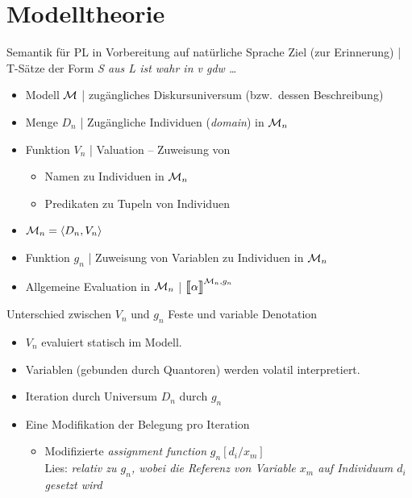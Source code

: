 \section{Modelltheorie}

\begin{frame}
  {Semantik für PL in Vorbereitung auf natürliche Sprache}
  \onslide<+->
  \onslide<+->
  Ziel (zur Erinnerung) | T-Sätze der Form \textit{S aus L ist wahr in v gdw \ldots}\\
  \Halbzeile
  \begin{itemize}[<+->]
    \item \alert{Modell $\mathcal{M}$} | zugängliches Diskursuniversum (bzw.\ dessen Beschreibung)
    \item \alert{Menge $D_n$} | Zugängliche Individuen (\textit{domain}) in $\mathcal{M}_n$
    \item \alert{Funktion $V_n$} | Valuation -- Zuweisung von
      \begin{itemize}[<+->]
        \item Namen zu Individuen in $\mathcal{M}_n$
        \item Predikaten zu Tupeln von Individuen
      \end{itemize}
    \item \alert{$\mathcal{M}_n=\langle{}D_n,V_n\rangle$}
      \Halbzeile
    \item \alert{Funktion $g_n$} | Zuweisung von Variablen zu Individuen in $\mathcal{M}_n$ 
      \Halbzeile
    \item Allgemeine Evaluation in $\mathcal{M}_n$ | $\dem{\alpha}^{\Model_n,g_n}$\\
  \end{itemize}
\end{frame}

\begin{frame}
  {Unterschied zwischen $V_n$ und $g_n$}
  \onslide<+->
  \onslide<+->
  Feste und variable Denotation\\
  \Halbzeile
  \begin{itemize}[<+->]
    \item $V_n$ evaluiert \alert{statisch} im Modell.\\
      \Halbzeile
    \item Variablen (gebunden durch Quantoren) werden \alert{volatil interpretiert}.\\
    \item \alert{Iteration} durch Universum $D_n$ durch $g_n$
    \item Eine Modifikation der Belegung pro Iteration
      \begin{itemize}[<+->]
        \item Modifizierte \textit{assignment function} \alert{$g_n[d_i/x_m]$}\\
          Lies: \textit{relativ zu $g_n$, wobei die Referenz von Variable $x_m$ auf Individuum $d_i$ gesetzt wird}
      \end{itemize}
  \end{itemize}
\end{frame}

